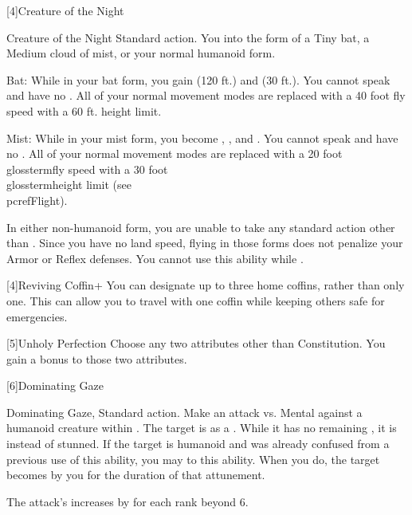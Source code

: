 [4]{Creature of the Night}
\begin{magicalattuneability}{Creature of the Night}{}
	\abilityusagetime Standard action.
	\rankline
	You  into the form of a Tiny bat, a Medium cloud of mist, or your normal humanoid form.
	\begin{raggeditemize}
		\item Bat: While in your bat form, you gain  (120 ft.) and  (30 ft.).
		You cannot speak and have no .
		All of your normal movement modes are replaced with a 40 foot fly speed with a 60 ft. height limit.
		\item Mist: While in your mist form, you become , , and .
		You cannot speak and have no .
		All of your normal movement modes are replaced with a 20 foot \\glossterm{fly speed} with a 30 foot \\glossterm{height limit} (see \\pcref{Flight}).
	\end{raggeditemize}

	In either non-humanoid form, you are unable to take any standard action other than .
	Since you have no land speed, flying in those forms does not penalize your Armor or Reflex defenses.
	You cannot use this ability while \paralyzed.
\end{magicalattuneability}

[4]{Reviving Coffin+} You can designate up to three home coffins, rather than only one.
This can allow you to travel with one coffin while keeping others safe for emergencies.

[5]{Unholy Perfection} Choose any two attributes other than Constitution.
You gain a  bonus to those two attributes.

[6]{Dominating Gaze}
\begin{magicalactiveability}{Dominating Gaze}{, }
	\abilityusagetime Standard action.
	\rankline
	Make an attack vs. Mental against a humanoid creature within \shortrange.
	\hit The target is \stunned as a .
	While it has no remaining , it is \confused instead of stunned.
	\crit If the target is humanoid and was already confused from a previous use of this ability, you may  to this ability.
	When you do, the target becomes \dominated by you for the duration of that attunement.

	\rankline
	The attack's  increases by  for each rank beyond 6.
\end{magicalactiveability}

